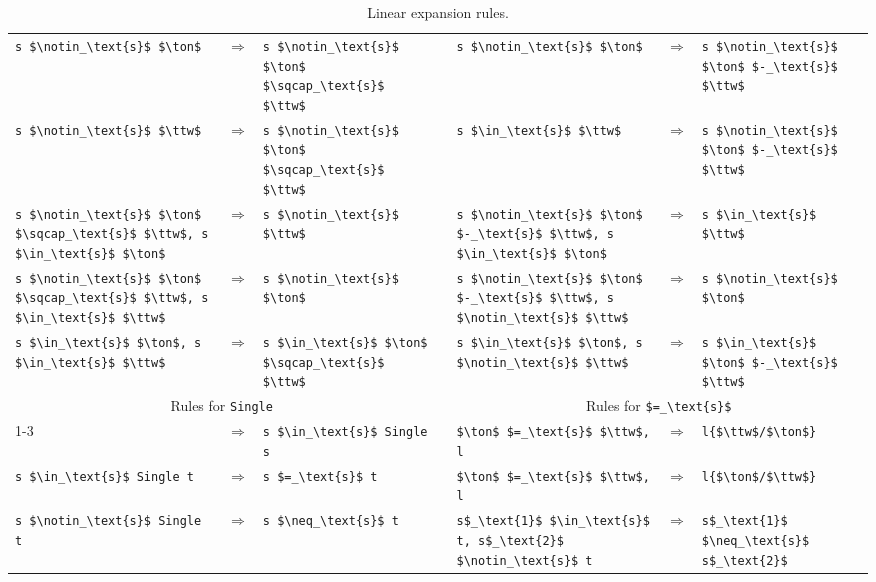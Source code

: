 \documentclass[sigplan,10pt,anonymous,review]{acmart}
\newcommand{\interS}{\sqcap_\text{s}}
\newcommand{\diffS}{-_\text{s}}
\newcommand{\inS}{\in_\text{s}}
\newcommand{\notinS}{\notin_\text{s}}
\newcommand{\eqS}{=_\text{s}}
\newcommand{\neqS}{\neq_\text{s}}
\begin{document}
\begin{table*}
\begin{tabular}{p{}cp{} p{} p{}cp{}}
    \lstinline!s $\notinS$ $\ton$! & $\Longrightarrow$ & \lstinline!s $\notinS$ $\ton$ $\interS$ $\ttw$! && 
    \lstinline!s $\notinS$ $\ton$! & $\Longrightarrow$ & \lstinline!s $\notinS$ $\ton$ $\diffS$ $\ttw$! \\

    \lstinline!s $\notinS$ $\ttw$! & $\Longrightarrow$ & \lstinline!s $\notinS$ $\ton$ $\interS$ $\ttw$! &&
    \lstinline!s $\inS$ $\ttw$! & $\Longrightarrow$ & \lstinline!s $\notinS$ $\ton$ $\diffS$ $\ttw$! \\

    \lstinline!s $\notinS$ $\ton$ $\interS$ $\ttw$, s $\inS$ $\ton$! & $\Longrightarrow$ & \lstinline!s $\notinS$ $\ttw$! && 
    \lstinline!s $\notinS$ $\ton$ $\diffS$ $\ttw$, s $\inS$ $\ton$! & $\Longrightarrow$ & \lstinline!s $\inS$ $\ttw$! \\

    \lstinline!s $\notinS$ $\ton$ $\interS$ $\ttw$, s $\inS$ $\ttw$! & $\Longrightarrow$ & \lstinline!s $\notinS$ $\ton$! && 
    \lstinline!s $\notinS$ $\ton$ $\diffS$ $\ttw$, s $\notinS$ $\ttw$! & $\Longrightarrow$ & \lstinline!s $\notinS$ $\ton$! \\

    \lstinline!s $\inS$ $\ton$, s $\inS$ $\ttw$! & $\Longrightarrow$ & \lstinline!s $\inS$ $\ton$ $\interS$ $\ttw$! &&
    \lstinline!s $\inS$ $\ton$, s $\notinS$ $\ttw$! & $\Longrightarrow$ & \lstinline!s $\inS$ $\ton$ $\diffS$ $\ttw$! \\[3ex]

    \multicolumn{3}{c}{Rules for \lstinline!Single!} && \multicolumn{3}{c}{Rules for \lstinline!$\eqS$!} \\
    \cmidrule{1-3}\cmidrule{5-7}
    & $\Longrightarrow$ & \lstinline!s $\inS$ Single s! &&
    \lstinline!$\ton$ $\eqS$ $\ttw$, l! & $\Longrightarrow$ & \lstinline!l{$\ttw$/$\ton$}! \\

    \lstinline!s $\inS$ Single t! & $\Longrightarrow$ & \lstinline!s $\eqS$ t! &&
    \lstinline!$\ton$ $\eqS$ $\ttw$, l! & $\Longrightarrow$ & \lstinline!l{$\ton$/$\ttw$}! \\

    \lstinline!s $\notinS$ Single t! & $\Longrightarrow$ & \lstinline!s $\neqS$ t! &&
    \lstinline!s$_\text{1}$ $\inS$ t, s$_\text{2}$ $\notinS$ t! & $\Longrightarrow$ & \lstinline!s$_\text{1}$ $\neqS$ s$_\text{2}$! \\
    \bottomrule
  \end{tabular}
  \bigskip
  \caption{Linear expansion rules.\label{tab:lexpands}}
\end{table*}
\end{document}
